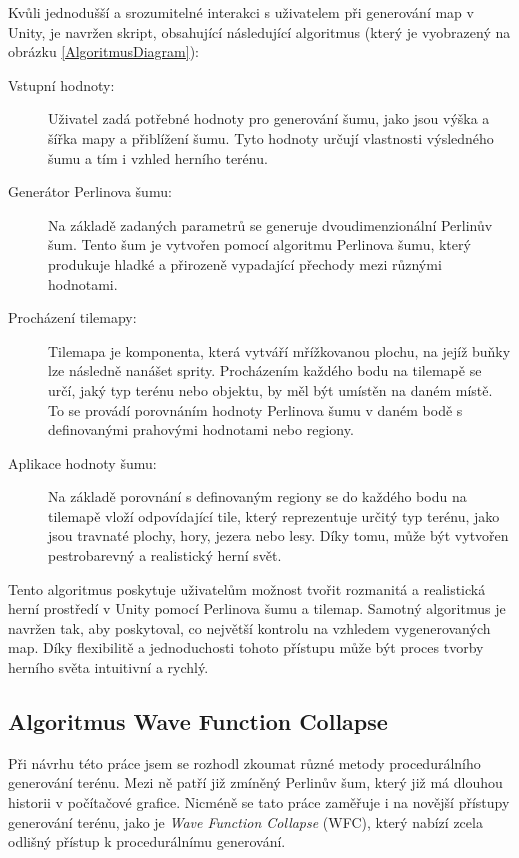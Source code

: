 Kvůli jednodušší a srozumitelné interakci s uživatelem při generování map v Unity, je navržen skript, obsahující následující algoritmus (který je vyobrazený na obrázku \ref{AlgoritmusDiagram}):

\begin{description}
	\item[Vstupní hodnoty:] Uživatel zadá potřebné hodnoty pro generování šumu, jako jsou výška a šířka mapy a přiblížení šumu. Tyto hodnoty určují vlastnosti výsledného šumu a tím i vzhled herního terénu.
	\item[Generátor Perlinova šumu:] Na základě zadaných parametrů se generuje dvoudimenzionální Perlinův šum. Tento šum je vytvořen pomocí algoritmu Perlinova šumu, který produkuje hladké a přirozeně vypadající přechody mezi různými hodnotami.
	\item[Procházení tilemapy:] Tilemapa je komponenta, která vytváří mřížkovanou plochu, na jejíž buňky lze následně nanášet sprity. Procházením každého bodu na tilemapě se určí, jaký typ terénu nebo objektu, by měl být umístěn na daném místě. To se provádí porovnáním hodnoty Perlinova šumu v daném bodě s definovanými prahovými hodnotami nebo regiony.
	\item[Aplikace hodnoty šumu:] Na základě porovnání s definovaným regiony se do každého bodu na tilemapě vloží odpovídající tile, který reprezentuje určitý typ terénu, jako jsou travnaté plochy, hory, jezera nebo lesy. Díky tomu, může být vytvořen pestrobarevný a realistický herní svět.
\end{description}

Tento algoritmus poskytuje uživatelům možnost tvořit rozmanitá a realistická herní prostředí v Unity pomocí Perlinova šumu a tilemap. Samotný algoritmus je navržen tak, aby poskytoval, co největší kontrolu na vzhledem vygenerovaných map. Díky flexibilitě a jednoduchosti tohoto přístupu může být proces tvorby herního světa intuitivní a rychlý. 

\subsection{Algoritmus Wave Function Collapse}
Při návrhu této práce jsem se rozhodl zkoumat různé metody procedurálního generování terénu. Mezi ně patří již zmíněný Perlinův šum, který již má dlouhou historii v počítačové grafice. Nicméně se tato práce zaměřuje i na novější přístupy generování terénu, jako je \textit{Wave Function Collapse} (WFC), který nabízí zcela odlišný přístup k procedurálnímu generování.

